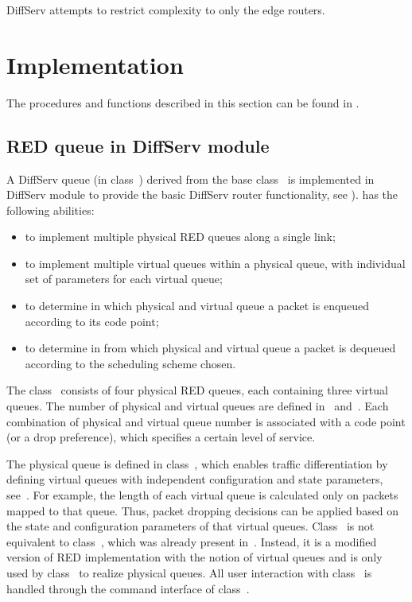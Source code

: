 DiffServ attempts to restrict complexity to only the edge routers.


\section{Implementation}
\label{sec:diffservimplement}

The procedures and functions described in this section can be found in
.

\subsection{RED queue in DiffServ module}
\label{sec:dsredq}

A DiffServ queue (in class~) derived from 
  the base class~ is implemented in DiffServ module to 
  provide the basic DiffServ router functionality, 
  see ).
 has the following abilities:

\begin{itemize}
\item
to implement multiple physical RED queues along a single link;
\item
to implement multiple virtual queues within a physical queue, 
  with individual set of parameters for each virtual queue;
\item
to determine in which physical and virtual queue a packet is enqueued 
  according to its code point;
\item
to determine in from which physical and virtual queue a packet is dequeued 
  according to the scheduling scheme chosen.
\end{itemize}

The class~ consists of four physical RED queues,
  each containing three virtual queues.
The number of physical and virtual queues are 
  defined in~ and~.
Each combination of physical and virtual queue number is associated with 
  a code point (or a drop preference), 
  which specifies a certain level of service.

The physical queue is defined in class~, 
  which enables traffic differentiation by defining virtual queues with
  independent configuration and state parameters,
  see~. 
For example, 
  the length of each virtual queue is calculated only on packets mapped to 
  that queue.  
Thus, packet dropping decisions can be applied based on 
  the state and configuration parameters of that virtual queues.
Class~ is not equivalent to class~,
  which was already present in~\ns.  
Instead, it is a modified version of RED implementation with 
  the notion of virtual queues and 
  is only used by class~ to realize physical queues.
All user interaction with class~ 
  is handled through the command interface of class~.


